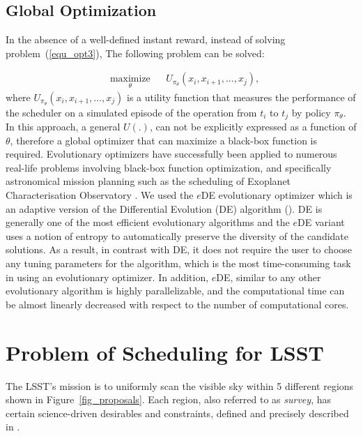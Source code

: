 \documentclass[12pt]{aastex62}
\theoremstyle{definition}
\begin{document}
\subsection{Global Optimization}\label{sec_gopt}
In the absence of a well-defined instant reward, instead of solving problem~(\ref{equ_opt3}), The following problem can be solved:

\begin{equation}%
\begin{aligned}
& \underset{\theta}{\text{maximize}}
& & U_{\pi_{\theta}}(x_i,x_{i+1}, \dots, x_{j}),
\end{aligned}
\end{equation}
where $U_{\pi_{\theta}}(x_i,x_{i+1}, \dots, x_{j})$ is a utility function that measures the performance of the scheduler on a simulated episode of the operation from $t_i$ to $t_j$ by policy $\pi_{\theta}$. In this approach, a general $U(.)$, can not be explicitly expressed as a function of $\theta$, therefore a global optimizer that can maximize a black-box function is required. Evolutionary optimizers have successfully been applied to numerous real-life problems involving black-box function optimization, and specifically astronomical mission planning such as the scheduling of Exoplanet Characterisation Observatory \citep{garcia2015artificial}. We used the $e$DE evolutionary optimizer \citep{naghib2016entropic} which is an adaptive version of the Differential Evolution (DE) algorithm (\citep{storn1997differential}). DE is generally one of the most efficient evolutionary algorithms and the $e$DE variant uses a notion of entropy to automatically preserve the diversity of the candidate solutions. As a result, in contrast with DE, it does not require the user to choose any tuning parameters for the algorithm, which is the most time-consuming task in using an evolutionary optimizer. In addition, $e$DE, similar to any other evolutionary algorithm is highly parallelizable, and the computational time can be almost linearly decreased with respect to the number of computational cores.

\section{Problem of Scheduling for LSST}\label{sec_lsst_problem}

The LSST's mission is to uniformly scan the visible sky within 5 different regions shown in Figure~\ref{fig_proposals}. Each region, also referred to as \textit{survey}, has certain science-driven desirables and constraints, defined and precisely described in \citep{ivezic2008large}.
\end{document}

